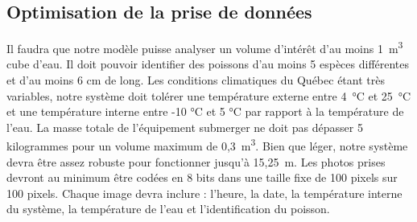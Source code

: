 

\subsection{Optimisation de la prise de données}
\label{s:beo_obj_optimdonn}

Il faudra que notre modèle puisse analyser un volume d’intérêt d’au moins 1~m\textsuperscript{3} cube d’eau.
Il doit pouvoir identifier des poissons d’au moins 5 espèces différentes et d’au moins 6 cm de long.
Les conditions climatiques du Québec étant très variables, notre système doit tolérer une température externe entre 4~°C et 25~°C et une température interne entre -10 °C et 5 °C par rapport à la température de l’eau.
La masse totale de l’équipement submerger ne doit pas dépasser 5 kilogrammes pour un volume maximum de 0,3~m\textsuperscript{3}.
Bien que léger, notre système devra être assez robuste pour fonctionner jusqu’à 15,25~m.
Les photos prises devront au minimum être codées en 8 bits dans une taille fixe de 100 pixels sur 100 pixels.
Chaque image devra inclure : l’heure, la date, la température interne du système, la température de l’eau et l’identification du poisson.